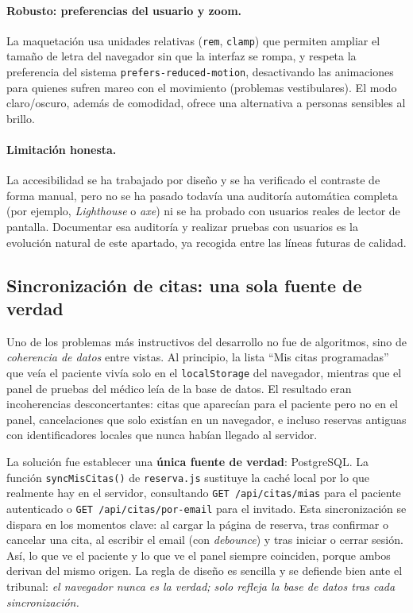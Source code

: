 \documentclass[12pt,a4paper]{report}
\begin{document}
\paragraph{Robusto: preferencias del usuario y zoom.} La maquetación usa unidades relativas (\texttt{rem}, \texttt{clamp}) que permiten ampliar el tamaño de letra del navegador sin que la interfaz se rompa, y respeta la preferencia del sistema \texttt{prefers-reduced-motion}, desactivando las animaciones para quienes sufren mareo con el movimiento (problemas vestibulares). El modo claro/oscuro, además de comodidad, ofrece una alternativa a personas sensibles al brillo.

\paragraph{Limitación honesta.} La accesibilidad se ha trabajado por diseño y se ha verificado el contraste de forma manual, pero no se ha pasado todavía una auditoría automática completa (por ejemplo, \emph{Lighthouse} o \emph{axe}) ni se ha probado con usuarios reales de lector de pantalla. Documentar esa auditoría y realizar pruebas con usuarios es la evolución natural de este apartado, ya recogida entre las líneas futuras de calidad.

\subsection{Sincronización de citas: una sola fuente de verdad}

Uno de los problemas más instructivos del desarrollo no fue de algoritmos, sino de \emph{coherencia de datos} entre vistas. Al principio, la lista ``Mis citas programadas'' que veía el paciente vivía solo en el \texttt{localStorage} del navegador, mientras que el panel de pruebas del médico leía de la base de datos. El resultado eran incoherencias desconcertantes: citas que aparecían para el paciente pero no en el panel, cancelaciones que solo existían en un navegador, e incluso reservas antiguas con identificadores locales que nunca habían llegado al servidor.

La solución fue establecer una \textbf{única fuente de verdad}: PostgreSQL. La función \texttt{syncMisCitas()} de \texttt{reserva.js} sustituye la caché local por lo que realmente hay en el servidor, consultando \texttt{GET /api/citas/mias} para el paciente autenticado o \texttt{GET /api/citas/por-email} para el invitado. Esta sincronización se dispara en los momentos clave: al cargar la página de reserva, tras confirmar o cancelar una cita, al escribir el email (con \emph{debounce}) y tras iniciar o cerrar sesión. Así, lo que ve el paciente y lo que ve el panel siempre coinciden, porque ambos derivan del mismo origen. La regla de diseño es sencilla y se defiende bien ante el tribunal: \emph{el navegador nunca es la verdad; solo refleja la base de datos tras cada sincronización.}
\end{document}
